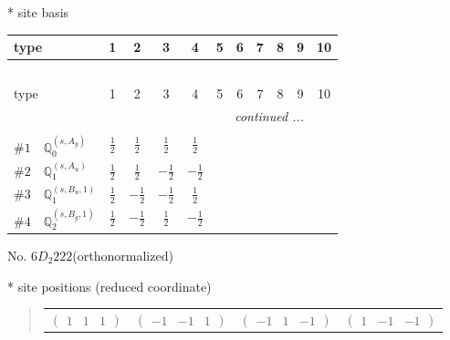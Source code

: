 \documentclass[fleqn,9pt,landscape]{jsarticle}
\begin{document}
* site basis
\begin{center}
\renewcommand{\arraystretch}{1.3}
\begin{longtable}{lcccccccccc}
 \hline \hline
type & 1 & 2 & 3 & 4 & 5 & 6 & 7 & 8 & 9 & 10 \\ \hline \endfirsthead

\multicolumn{10}{l}{\tablename\ \thetable{}} \\
 \hline \hline
type & 1 & 2 & 3 & 4 & 5 & 6 & 7 & 8 & 9 & 10 \\ \hline \endhead

 \hline \hline
\multicolumn{10}{r}{\footnotesize\it continued ...} \\ \endfoot

 \hline \hline
\multicolumn{10}{r}{} \\ \endlastfoot

$ \#1\quad \mathbb{Q}_{0}^{(s,A_{g})} $ & $ \frac{1}{2} $ & $ \frac{1}{2} $ & $ \frac{1}{2} $ & $ \frac{1}{2} $ \\ \hline
$ \#2\quad \mathbb{Q}_{1}^{(s,A_{u})} $ & $ \frac{1}{2} $ & $ \frac{1}{2} $ & $ - \frac{1}{2} $ & $ - \frac{1}{2} $ \\ \hline
$ \#3\quad \mathbb{Q}_{1}^{(s,B_{u},1)} $ & $ \frac{1}{2} $ & $ - \frac{1}{2} $ & $ - \frac{1}{2} $ & $ \frac{1}{2} $ \\ \hline
$ \#4\quad \mathbb{Q}_{2}^{(s,B_{g},1)} $ & $ \frac{1}{2} $ & $ - \frac{1}{2} $ & $ \frac{1}{2} $ & $ - \frac{1}{2} $ \\
\end{longtable}
\end{center}
\newpage
\begin{center}
\LARGE
No. 6\quad$D_{2}$\quad$222$\quad[ orthorhombic ] (orthonormalized)
\end{center}
\vspace{5mm}
* site positions (reduced coordinate)
\begin{quote}
\begin{tabular}{cccc}
$ \begin{pmatrix} 1 & 1 & 1 \end{pmatrix} $ & $ \begin{pmatrix} -1 & -1 & 1 \end{pmatrix} $ & $ \begin{pmatrix} -1 & 1 & -1 \end{pmatrix} $ & $ \begin{pmatrix} 1 & -1 & -1 \end{pmatrix} $
\end{tabular}
\end{quote}
\end{document}
